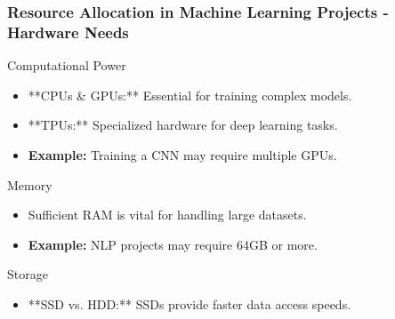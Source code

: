 \documentclass[aspectratio=169]{beamer}
\begin{document}
\begin{frame}[fragile]
    \frametitle{Resource Allocation in Machine Learning Projects - Hardware Needs}
    \begin{block}{Computational Power}
        \begin{itemize}
            \item **CPUs \& GPUs:** Essential for training complex models.
            \item **TPUs:** Specialized hardware for deep learning tasks.
            \item \textbf{Example:} Training a CNN may require multiple GPUs.
        \end{itemize}
    \end{block}
    
    \begin{block}{Memory}
        \begin{itemize}
            \item Sufficient RAM is vital for handling large datasets.
            \item \textbf{Example:} NLP projects may require 64GB or more.
        \end{itemize}
    \end{block}

    \begin{block}{Storage}
        \begin{itemize}
            \item **SSD vs. HDD:** SSDs provide faster data access speeds.
        \end{itemize}
    \end{block}
\end{frame}
\end{document}
